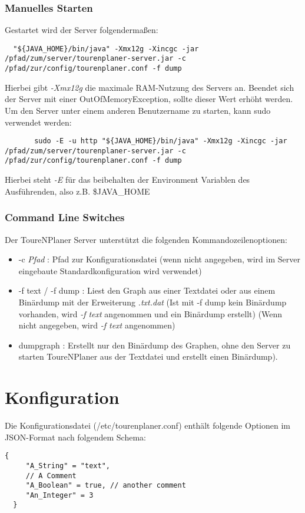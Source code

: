 \documentclass[ngerman,titlepage,parskip=true]{scrartcl}
\begin{document}
	\subsubsection{Manuelles Starten}
  Gestartet wird der Server folgenderma\ss{}en:
	\begin{lstlisting}
  "${JAVA_HOME}/bin/java" -Xmx12g -Xincgc -jar /pfad/zum/server/tourenplaner-server.jar -c /pfad/zur/config/tourenplaner.conf -f dump
	\end{lstlisting}
	Hierbei gibt \textit{-Xmx12g} die maximale RAM-Nutzung des Servers an. Beendet sich der Server mit einer OutOfMemoryException, sollte dieser Wert erh\"oht werden.
	Um den Server unter einem anderen Benutzername zu starten, kann sudo verwendet werden:
	\begin{lstlisting}
	   sudo -E -u http "${JAVA_HOME}/bin/java" -Xmx12g -Xincgc -jar /pfad/zum/server/tourenplaner-server.jar -c /pfad/zur/config/tourenplaner.conf -f dump
	\end{lstlisting}
  Hierbei steht \textit{-E} f\"ur das beibehalten der Environment Variablen des Ausf\"uhrenden, also z.B. \$JAVA\_HOME


	\subsubsection{Command Line Switches}
	Der ToureNPlaner Server unterst\"utzt die folgenden Kommandozeilenoptionen:
	\begin{itemize}
	  \item -c \textit{Pfad} : Pfad zur Konfigurationsdatei (wenn nicht angegeben, wird im Server eingebaute Standardkonfiguration wird verwendet)
	  \item -f text / -f dump : Liest den Graph aus einer Textdatei oder aus einem Bin\"ardump mit der Erweiterung \textit{.txt.dat} (Ist mit -f dump kein Bin\"ardump vorhanden, wird \textit{-f text} angenommen und ein Bin\"ardump erstellt) (Wenn nicht angegeben, wird \textit{-f text} angenommen)
	 \item dumpgraph : Erstellt nur den Bin\"ardump des Graphen, ohne den Server zu starten
	  ToureNPlaner aus der Textdatei und erstellt einen Bin\"ardump).
	\end{itemize}

\section{Konfiguration}
Die Konfigurationsdatei (/etc/tourenplaner.conf) enth\"alt folgende Optionen im JSON-Format nach folgendem Schema:
\begin{lstlisting}[caption=Konfigurations-Schema,float]
  {
	 "A_String" = "text",
	 // A Comment
	 "A_Boolean" = true, // another comment
	 "An_Integer" = 3
  }
\end{lstlisting}
\end{document}
